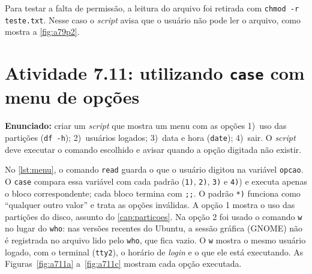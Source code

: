 Para testar a falta de permissão, a leitura do arquivo foi retirada com
\texttt{chmod -r teste.txt}. Nesse caso o \textit{script} avisa que o usuário não pode ler o
arquivo, como mostra a \autoref{fig:a79p2}.


\section{Atividade 7.11: utilizando \texttt{case} com menu de opções}\label{sec:a711}

\textbf{Enunciado:} criar um \textit{script} que mostra um menu com as opções 1)~uso das
partições (\texttt{df -h}); 2)~usuários logados; 3)~data e hora (\texttt{date});
4)~sair. O \textit{script} deve executar o comando escolhido e avisar quando a opção digitada
não existir.



No \autoref{lst:menu}, o comando \texttt{read} guarda o que o usuário digitou na variável
\texttt{opcao}. O \texttt{case} compara essa variável com cada padrão (\texttt{1)}, \texttt{2)},
\texttt{3)} e \texttt{4)}) e executa apenas o bloco correspondente; cada bloco termina com
\texttt{;;}. O padrão \texttt{*)} funciona como ``qualquer outro valor'' e trata as opções
inválidas. A opção 1 mostra o uso das partições do disco, assunto do
\autoref{cap:particoes}. Na opção 2 foi usado o comando \texttt{w} no lugar do \texttt{who}:
nas versões recentes do Ubuntu, a sessão gráfica (GNOME) não é registrada no arquivo lido pelo
\texttt{who}, que fica vazio. O \texttt{w} mostra o mesmo usuário logado, com o terminal
(\texttt{tty2}), o horário de \textit{login} e o que ele está executando. As
Figuras~\ref{fig:a711a} a~\ref{fig:a711c} mostram cada opção executada.

